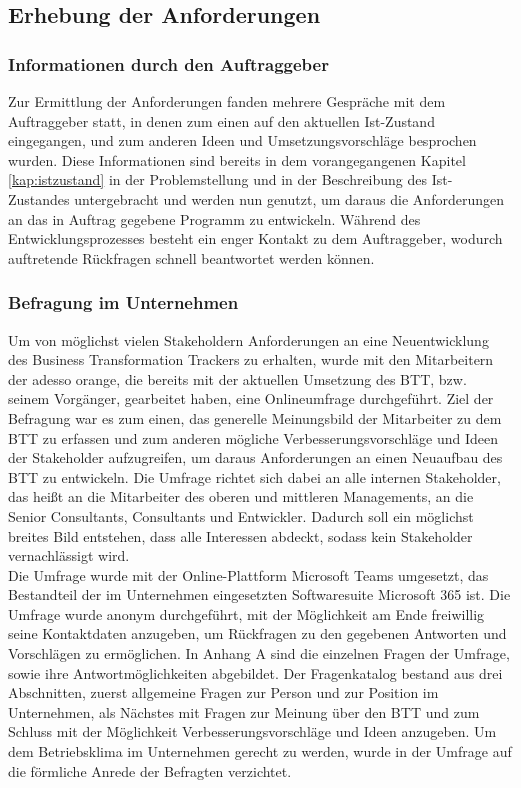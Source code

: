 \subsection{Erhebung der Anforderungen}
\subsubsection{Informationen durch den Auftraggeber}
Zur Ermittlung der Anforderungen fanden mehrere Gespräche mit dem Auftraggeber statt, in denen zum einen auf den aktuellen Ist-Zustand eingegangen, und zum anderen Ideen und Umsetzungsvorschläge besprochen wurden. Diese Informationen sind bereits in dem vorangegangenen Kapitel \ref{kap:istzustand} in der Problemstellung und in der Beschreibung des Ist-Zustandes untergebracht und werden nun genutzt, um daraus die Anforderungen an das in Auftrag gegebene Programm zu entwickeln. Während des Entwicklungsprozesses besteht ein enger Kontakt zu dem Auftraggeber, wodurch auftretende Rückfragen schnell beantwortet werden können. 

\subsubsection{Befragung im Unternehmen}
\label{kap:Umfrage}
Um von möglichst vielen Stakeholdern Anforderungen an eine Neuentwicklung des Business Transformation Trackers zu erhalten, wurde mit den Mitarbeitern der adesso orange, die bereits mit der aktuellen Umsetzung des BTT, bzw. seinem Vorgänger, gearbeitet haben, eine Onlineumfrage durchgeführt. Ziel der Befragung war es zum einen, das generelle Meinungsbild der Mitarbeiter zu dem BTT zu erfassen und zum anderen mögliche Verbesserungsvorschläge und Ideen der Stakeholder aufzugreifen, um daraus Anforderungen an einen Neuaufbau des BTT zu entwickeln. Die Umfrage richtet sich dabei an alle internen Stakeholder, das heißt an die Mitarbeiter des oberen und mittleren Managements, an die Senior Consultants, Consultants und Entwickler. Dadurch soll ein möglichst breites Bild entstehen, dass alle Interessen abdeckt, sodass kein Stakeholder vernachlässigt wird.\\Die Umfrage wurde mit der Online-Plattform \glqq{}Microsoft Teams\grqq{} umgesetzt, das Bestandteil der im Unternehmen eingesetzten Softwaresuite \glqq{}Microsoft 365\grqq{} ist. Die Umfrage wurde anonym durchgeführt, mit der Möglichkeit am Ende freiwillig seine Kontaktdaten anzugeben, um Rückfragen zu den gegebenen Antworten und Vorschlägen zu ermöglichen. In Anhang A sind die einzelnen Fragen der Umfrage, sowie ihre Antwortmöglichkeiten abgebildet. Der Fragenkatalog bestand aus drei Abschnitten, zuerst allgemeine Fragen zur Person und zur Position im Unternehmen, als Nächstes mit Fragen zur Meinung über den BTT und zum Schluss mit der Möglichkeit Verbesserungsvorschläge und Ideen anzugeben. Um dem Betriebsklima im Unternehmen gerecht zu werden, wurde in der Umfrage auf die förmliche Anrede der Befragten verzichtet.

